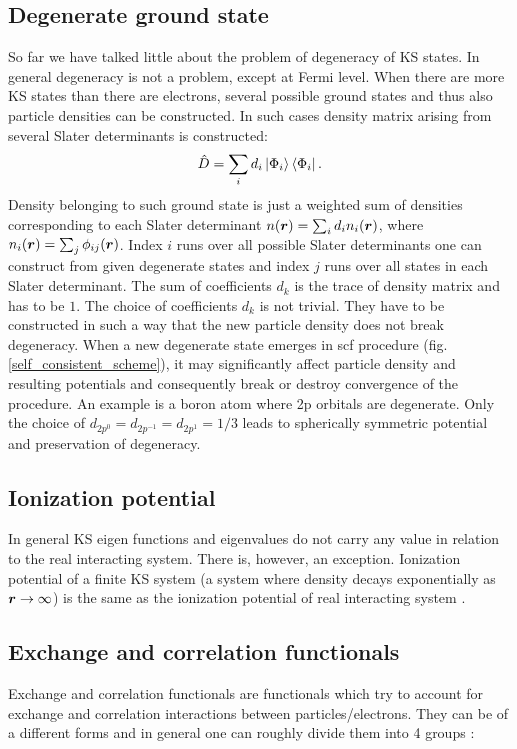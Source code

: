 \documentclass[openany, longbibliography,slovene,a4paper,12pt]{article}
\def\vec#1{\mbox{\boldmath$#1$}}
\begin{document}
\subsection{Degenerate ground state}
So far we have talked little about the problem of degeneracy of KS states. In
general degeneracy is not a problem, except at Fermi level. When there are more
KS states than there are electrons, several possible ground states and thus also
particle densities can be constructed. In such cases density matrix arising from
several Slater determinants is constructed:
\begin{equation}
  \hat D = \sum_i d_i\ket{\Phi_i} \bra{\Phi_i}.
  \end{equation}
Density belonging to such ground state is just a weighted sum of densities
corresponding to each Slater determinant $n(\vec r)=\sum_id_in_i(\vec r)$, where
$n_i(\vec r)=\sum_j\phi_{ij}(\vec r)$. Index $i$ runs over all possible
Slater determinants one can construct from given degenerate states and index $j$
runs over all states in each Slater determinant. The sum of coefficients $d_k$
is the trace of density matrix and has to be $1$. The choice of coefficients
$d_k$ is not trivial. They have to be constructed in such a way that the new
particle density does not break degeneracy. When a new degenerate state emerges in
scf procedure (fig. \ref{self_consistent_scheme}), it may significantly affect
particle density and resulting potentials and consequently break or destroy
convergence of the procedure. An example is a boron atom where 2p orbitals are
degenerate. Only the choice of $d_{2p^0}=d_{2p^{-1}}=d_{2p^1}=1/3$ leads to spherically symmetric potential and preservation of degeneracy\cite{advanced_course}.

\subsection{Ionization potential}
In general KS eigen functions and eigenvalues do not carry any value in relation
to the real interacting system. There is, however, an exception. Ionization
potential of a finite KS system (a system where density decays exponentially as
$\vec r \rightarrow \infty$) is the same as the ionization potential of real
interacting system \cite{advanced_course}.
  
\subsection{Exchange and correlation functionals}
Exchange and correlation functionals are functionals which try to account for
exchange and correlation interactions between particles/electrons. They can be of a
different forms and in general one can roughly divide them into 4 groups \cite{challenges_den_fun_theor}:
\end{document}
